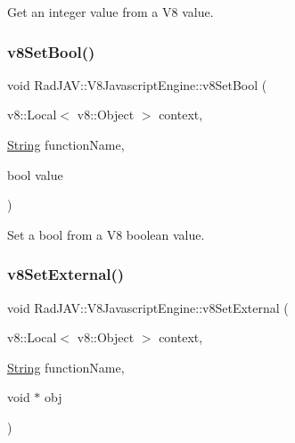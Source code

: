 Get an integer value from a V8 value. 

\mbox{\label{class_rad_j_a_v_1_1_v8_javascript_engine_a063f58908a039df554d99bffd8883cb5}} 
\subsubsection{\texorpdfstring{v8\+Set\+Bool()}{v8SetBool()}}
{\footnotesize\ttfamily void Rad\+J\+A\+V\+::\+V8\+Javascript\+Engine\+::v8\+Set\+Bool (\begin{DoxyParamCaption}\item[{v8\+::\+Local$<$ v8\+::\+Object $>$}]{context,  }\item[{\mbox{\hyperlink{class_rad_j_a_v_1_1_string}{String}}}]{function\+Name,  }\item[{bool}]{value }\end{DoxyParamCaption})}



Set a bool from a V8 boolean value. 

\mbox{\label{class_rad_j_a_v_1_1_v8_javascript_engine_a5ebb5a5ca3ff577e0f32b16eb36827de}} 
\subsubsection{\texorpdfstring{v8\+Set\+External()}{v8SetExternal()}}
{\footnotesize\ttfamily void Rad\+J\+A\+V\+::\+V8\+Javascript\+Engine\+::v8\+Set\+External (\begin{DoxyParamCaption}\item[{v8\+::\+Local$<$ v8\+::\+Object $>$}]{context,  }\item[{\mbox{\hyperlink{class_rad_j_a_v_1_1_string}{String}}}]{function\+Name,  }\item[{void $\ast$}]{obj }\end{DoxyParamCaption})}



